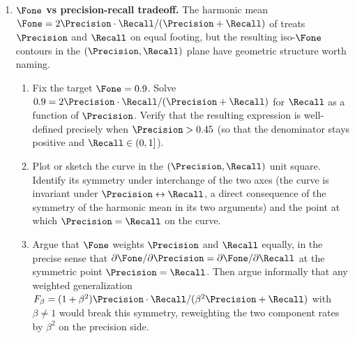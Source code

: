 \begin{enumerate}
\item \exstarstarstar
\label{ex:ch7-11}
\textbf{$\Fone$ vs precision-recall tradeoff.}
The harmonic mean $\Fone = 2 \Precision \cdot \Recall / (\Precision
+ \Recall)$ of  treats $\Precision$ and $\Recall$ on
equal footing, but the resulting iso-$\Fone$ contours in the
$(\Precision, \Recall)$ plane have geometric structure worth naming.
\begin{enumerate}
  \item[(a)] Fix the target $\Fone = 0.9$. Solve
    $0.9 = 2 \Precision \cdot \Recall / (\Precision + \Recall)$
    for $\Recall$ as a function of $\Precision$. Verify that the
    resulting expression is well-defined precisely when
    $\Precision > 0.45$ (so that the denominator stays positive
    and $\Recall \in (0, 1]$).
  \item[(b)] Plot or sketch the curve in the $(\Precision,
    \Recall)$ unit square. Identify its symmetry under
    interchange of the two axes (the curve is invariant under
    $\Precision \leftrightarrow \Recall$, a direct consequence
    of the symmetry of the harmonic mean in its two arguments)
    and the point at which $\Precision = \Recall$ on the curve.
  \item[(c)] Argue that $\Fone$ weights $\Precision$ and
    $\Recall$ equally, in the precise sense that
    $\partial \Fone / \partial \Precision = \partial \Fone /
    \partial \Recall$ at the symmetric point $\Precision =
    \Recall$. Then argue informally that any weighted
    generalization $F_\beta = (1 + \beta^2) \Precision \cdot
    \Recall / (\beta^2 \Precision + \Recall)$ with $\beta \neq
    1$ would break this symmetry, reweighting the two component
    rates by $\beta^2$ on the precision side.
\end{enumerate}

\end{enumerate}
